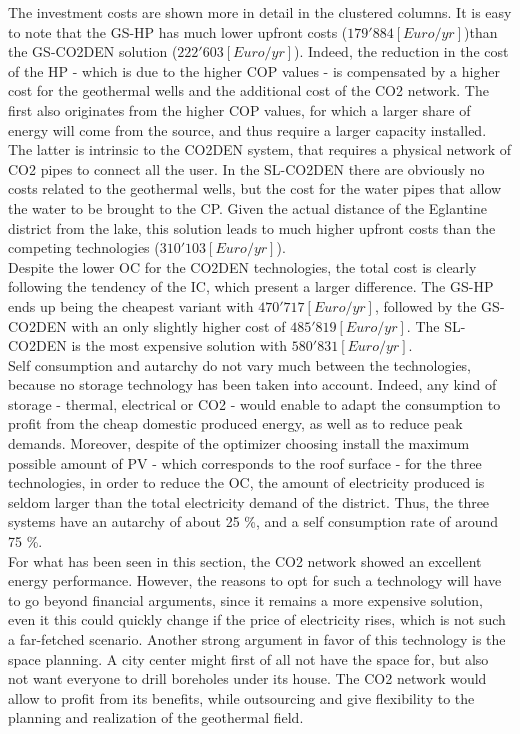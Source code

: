 \documentclass{article}
\begin{document}
The investment costs are shown more in detail in the clustered columns. It is easy to note that the GS-HP has much lower upfront costs ($179'884[Euro/yr]$)than the GS-CO2DEN solution ($222'603[Euro/yr]$). Indeed, the reduction in the cost of the HP - which is due to the higher COP values - is compensated by a higher cost for the geothermal wells and the additional cost of the CO2 network. The first also originates from the higher COP values, for which a larger share of energy will come from the source, and thus require a larger capacity installed. The latter is intrinsic to the CO2DEN system, that requires a physical network of CO2 pipes to connect all the user. In the SL-CO2DEN there are obviously no costs related to the geothermal wells, but the cost for the water pipes that allow the water to be brought to the CP. Given the actual distance of the Eglantine district from the lake, this solution leads to much higher upfront costs than the competing technologies ($310'103[Euro/yr]$).\\

Despite the lower OC for the CO2DEN technologies, the total cost is clearly following the tendency of the IC, which present a larger difference. The GS-HP ends up being the cheapest variant with $470'717 [Euro/yr]$, followed by the GS-CO2DEN with an only slightly higher cost of $485'819 [Euro/yr]$. The SL-CO2DEN is the most expensive solution with $580'831 [Euro/yr]$.\\

Self consumption and autarchy do not vary much between the technologies, because no storage technology has been taken into account. Indeed, any kind of storage - thermal, electrical or CO2 - would enable to adapt the consumption to profit from the cheap domestic produced energy, as well as to reduce peak demands. Moreover, despite of the optimizer choosing install the maximum possible amount of PV - which corresponds to the roof surface - for the three technologies, in order to reduce the OC, the amount of electricity produced is seldom larger than the total electricity demand of the district. Thus, the three systems have an autarchy of about 25 \%, and a self consumption rate of around 75 \%.\\

For what has been seen in this section, the CO2 network showed an excellent energy performance. However, the reasons to opt for such a technology will have to go beyond financial arguments, since it remains a more expensive solution, even it this could quickly change if the price of electricity rises, which is not such a far-fetched scenario. Another strong argument in favor of this technology is the space planning. A city center might first of all not have the space for, but also not want everyone to drill boreholes under its house. The CO2 network would allow to profit from its benefits, while outsourcing and give flexibility to the planning and realization of the geothermal field.
\end{document}

